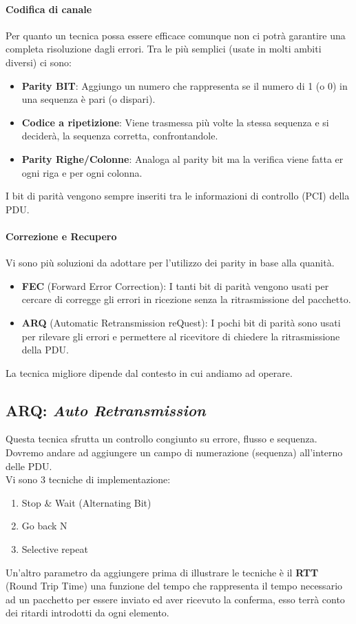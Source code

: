 \documentclass[12pt]{article}
\begin{document}
\paragraph{Codifica di canale} Per quanto un tecnica possa essere efficace comunque non ci potrà garantire una completa risoluzione dagli errori. Tra le più semplici (usate in molti ambiti diversi) ci sono:
\begin{itemize}
  \item \textbf{Parity BIT}: Aggiungo un numero che rappresenta se il numero di 1 (o 0) in una sequenza è pari (o dispari).
  \item \textbf{Codice a ripetizione}: Viene trasmessa più volte la stessa sequenza e si deciderà, la sequenza corretta, confrontandole.
  \item \textbf{Parity Righe/Colonne}: Analoga al parity bit ma la verifica viene fatta er ogni riga e per ogni colonna.
\end{itemize}
I bit di parità vengono sempre inseriti tra le informazioni di controllo (PCI) della PDU.
\paragraph{Correzione e Recupero}
Vi sono più soluzioni da adottare per l'utilizzo dei parity in base alla quanità.
\begin{itemize}
  \item \textbf{FEC} (Forward Error Correction): I tanti bit di parità vengono usati per cercare di corregge gli errori in ricezione senza la ritrasmissione del pacchetto.
  \item \textbf{ARQ} (Automatic Retransmission reQuest): I pochi bit di parità sono usati per rilevare gli errori e permettere al ricevitore di chiedere la ritrasmissione della PDU.
\end{itemize}
La tecnica migliore dipende dal contesto in cui andiamo ad operare.

\subsection{ARQ: \textit{Auto Retransmission}} \label{subsec:arq}
Questa tecnica sfrutta un controllo congiunto su errore, flusso e sequenza. Dovremo andare ad aggiungere un campo di numerazione (sequenza) all'interno delle PDU.\\
Vi sono 3 tecniche di implementazione:
\begin{enumerate}
  \item Stop \& Wait (Alternating Bit)
  \item Go back N
  \item Selective repeat
\end{enumerate}
Un'altro parametro da aggiungere prima di illustrare le tecniche è il \textbf{RTT} (Round Trip Time) una funzione del tempo che rappresenta il tempo necessario ad un pacchetto per essere inviato ed aver ricevuto la conferma, esso terrà conto dei ritardi introdotti da ogni elemento.
\end{document}
